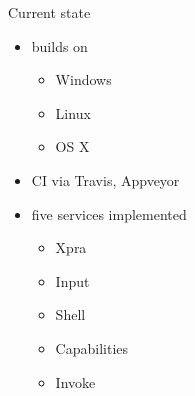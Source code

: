 \documentclass[a4paper]{beamer}
\begin{document}
\begin{frame}{Current state}
    \begin{itemize}
        \item builds on
            \begin{itemize}
                \item Windows
                \item Linux
                \item OS X
            \end{itemize}
        \item CI via Travis, Appveyor
        \item five services implemented
            \begin{itemize}
                \item Xpra
                \item Input
                \item Shell
                \item Capabilities
                \item Invoke
            \end{itemize}
    \end{itemize}
\end{frame}
\end{document}
